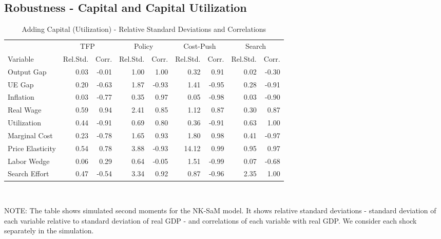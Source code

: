 \documentclass[12pt,3p,authoryear,review]{elsarticle}
\begin{document}
\subsection{Robustness - Capital and Capital Utilization}\label{sec:robust_capital}%
\begin{table}[h!]%
	\begin{center}%
		\begin{footnotesize}%
			\caption{Adding Capital (Utilization) - Relative Standard Deviations and Correlations}\label{tab:app_robust_capital}%
			\begin{tabular}{l r r r r r r r r}%
				\hline%
				& \multicolumn{2}{c}{TFP} & \multicolumn{2}{c}{Policy} & \multicolumn{2}{c}{Cost-Push} & \multicolumn{2}{c}{Search}\\%
				Variable & Rel.Std. & Corr. & Rel.Std. & Corr. & Rel.Std. & Corr. & Rel.Std. & Corr.\\%
				\hline \hline%
				Output Gap & 0.03 & -0.01 & 1.00 & 1.00 & 0.32 & 0.91 & 0.02 & -0.30\\%
				UE Gap & 0.20 & -0.63 & 1.87 & -0.93 & 1.41 & -0.95 & 0.28 & -0.91\\%
				Inflation & 0.03 & -0.77 & 0.35 & 0.97 & 0.05 & -0.98 & 0.03 & -0.90\\%
				Real Wage & 0.59 & 0.94 & 2.41 & 0.85 & 1.12 & 0.87 & 0.30 & 0.87\\%
				Utilization & 0.44 & -0.91 & 0.69 & 0.80 & 0.36 & -0.91 & 0.63 & 1.00\\%
				Marginal Cost & 0.23 & -0.78 & 1.65 & 0.93 & 1.80 & 0.98 & 0.41 & -0.97\\%
				Price Elasticity & 0.54 & 0.78 & 3.88 & -0.93 & 14.12 & 0.99 & 0.95 & 0.97\\%
				Labor Wedge & 0.06 & 0.29 & 0.64 & -0.05 & 1.51 & -0.99 & 0.07 & -0.68\\%
				Search Effort & 0.47 & -0.54 & 3.34 & 0.92 & 0.87 & -0.96 & 2.35 & 1.00\\%
				\hline%
			\end{tabular}\\%
			\vspace{0.1in}%
			{\tiny NOTE: The table shows simulated second moments for the NK-SaM model. It shows relative standard deviations - standard deviation of each variable relative to standard deviation of real GDP - and correlations of each variable with real GDP. We consider each shock separately in the simulation.\par}%
		\end{footnotesize}%
	\end{center}%
\end{table}%
\end{document}
